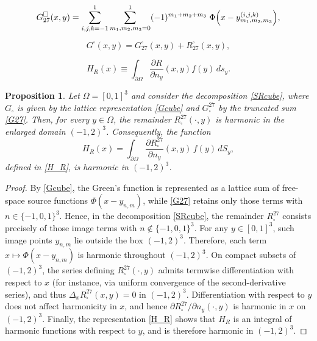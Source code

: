 \documentclass[10pt,a4paper]{amsart}
\newtheorem{proposition}{Proposition}
\begin{document}
\begin{equation}\label{G27}
G^\square_{\text{27}}(x,y)
= \sum_{i,j,k=-1}^{1} 
  \sum_{m_1,m_2,m_3=0}^{1} 
  (-1)^{m_1+m_2+m_3}\;
  \Phi\Bigl(
    x - y^{(i,j,k)}_{m_1,m_2,m_3}
  \Bigr),
\end{equation}

\begin{equation}
G^\square(x,y) = G^\square_{27}(x,y) + R^\square_{27}(x,y),
\label{SRcube}
\end{equation}

\begin{equation}\label{H_R}
H_R(x)\equiv \int_{\partial\Omega}
    \frac{\partial R}{\partial n_y}(x,y)f(y)\, ds_y .
\end{equation}

\begin{proposition}
Let $\Omega=[0,1]^3$ and consider the decomposition
\eqref{SRcube}, where $G_{\square}$ is given by the lattice
representation \eqref{Gcube} and $G_{\square}^{27}$ by the
truncated sum \eqref{G27}.  
Then, for every $y\in\Omega$, the remainder
$R_{\square}^{27}(\cdot,y)$ is harmonic in the enlarged domain
$(-1,2)^3$.  Consequently, the function
\[
H_R(x)=\int_{\partial\Omega}
\frac{\partial R_{\square}^{27}}{\partial n_y}(x,y)\,
f(y)\,dS_y,
\]
defined in \eqref{H_R}, is harmonic in $(-1,2)^3$.
\end{proposition}

\begin{proof}
By \eqref{Gcube}, the Green’s function is represented as a
lattice sum of free-space source functions
$\Phi(x-y_{n,m})$, while \eqref{G27} retains only those
terms with $n\in\{-1,0,1\}^3$.
Hence, in the decomposition \eqref{SRcube}, the remainder
$R_{\square}^{27}$ consists precisely of those image terms
with $n\notin\{-1,0,1\}^3$.
For any $y\in[0,1]^3$, such image points $y_{n,m}$ lie
outside the box $(-1,2)^3$.
Therefore, each term
$x\mapsto\Phi(x-y_{n,m})$ is harmonic throughout
$(-1,2)^3$.
On compact subsets of $(-1,2)^3$, the series defining
$R_{\square}^{27}(\cdot,y)$ admits termwise differentiation
with respect to $x$ (for instance, via uniform convergence
of the second-derivative series),
and thus $\Delta_x R_{\square}^{27}(x,y)=0$
in $(-1,2)^3$.
Differentiation with respect to $y$ does not affect
harmonicity in $x$, and hence
$\partial R_{\square}^{27}/\partial n_y(\cdot,y)$
is harmonic in $x$ on $(-1,2)^3$.
Finally, the representation \eqref{H_R}
shows that $H_R$ is an integral of harmonic functions
with respect to $y$, and is therefore harmonic
in $(-1,2)^3$.
\end{proof}
\end{document}

